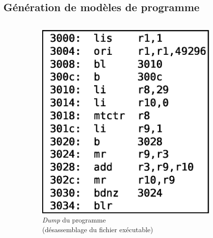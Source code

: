 \documentclass[final]{beamer}
\begin{document}
\begin{frame}
    \section{Génération de modèles de programme}
    \begin{columns}[t]      
      \begin{column}{.66\linewidth}
        \begin{figure}[ht]
          \centering
          \begin{subfigure}{.30\textwidth}
            \centering
            \includegraphics{img/dump-new.eps}
            \captionsetup{justification=centering}
            \caption{\emph{Dump} du programme \\
              (désassemblage du fichier exécutable)}
            \label{fig:dump}
          \end{subfigure}
          \begin{subfigure}{.30\textwidth}
            \centering

\end{subfigure}
\end{figure}
\end{column}
\end{columns}
\end{frame}
\end{document}
